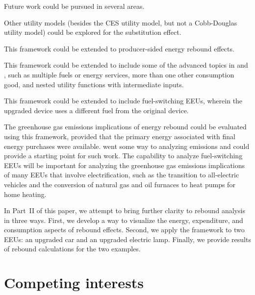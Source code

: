 \documentclass[12pt]{article}\usepackage[]{graphicx}\usepackage[]{xcolor}
\begin{document}
Future work could be pursued in several areas. 
%
\begin{enumerate*}[label={(\roman*)}]
	
  \item Other utility models
        (besides the CES utility model, but not a Cobb-Douglas utility model) 
        could be explored for the substitution effect.
  
  \item This framework could be extended to producer-sided energy rebound effects.
  
  \item This framework could be extended to include some of the advanced topics
        in \citet{Chan2015} and \citet{Wang2021}, 
        such as multiple fuels or energy services,
        more than one other consumption good, and
        nested utility functions with intermediate inputs.
        
  \item This framework could be extended to include fuel-switching EEUs,
        wherein the upgraded device uses a different fuel from the original device.
        
  \item The greenhouse gas emissions implications of energy rebound
        could be evaluated using this framework,
        provided that the primary energy associated with final energy
        purchases were available. 
        \citet{Borenstein:2015aa} went some way to analyzing emissions
        and could provide a starting point for such work.
        The capability to analyze fuel-switching EEUs
        will be important for analyzing the greenhouse gas emissions
        implications of many EEUs that involve electrification, 
        such as the transition to all-electric vehicles and 
        the conversion of natural gas and oil furnaces to heat pumps 
        for home heating.
  
\end{enumerate*}

In Part~II of this paper,
we attempt to bring further clarity to rebound analysis
in three ways. 
First, 
we develop a way to visualize 
the energy, expenditure, and consumption aspects
of rebound effects.
Second, we apply the framework to two EEUs:
an upgraded car and an upgraded electric lamp.
Finally, we provide results of rebound calculations for the two examples.


\section*{Competing interests}
\label{sec:competing_interests}
\end{document}
